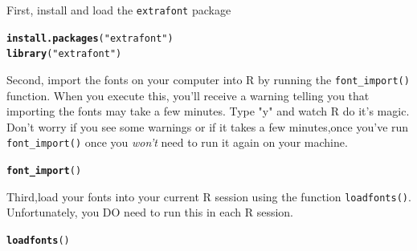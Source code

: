 \documentclass{tufte-book}\usepackage[]{graphicx}\usepackage[]{color}
\makeatletter
\newcommand{\hlstr}[1]{\textcolor[rgb]{0.192,0.494,0.8}{#1}}%
\newcommand{\hlstd}[1]{\textcolor[rgb]{0.345,0.345,0.345}{#1}}%
\newcommand{\hlkwd}[1]{\textcolor[rgb]{0.737,0.353,0.396}{\textbf{#1}}}%
\newenvironment{kframe}{%
 \def\at@end@of@kframe{}%
 \ifinner\ifhmode%
  \def\at@end@of@kframe{\end{minipage}}%
  \begin{minipage}{\columnwidth}%
 \fi\fi%
 \def\FrameCommand##1{\hskip\@totalleftmargin \hskip-\fboxsep
 \colorbox{shadecolor}{##1}\hskip-\fboxsep
     \hskip-\linewidth \hskip-\@totalleftmargin \hskip\columnwidth}%
 \MakeFramed {\advance\hsize-\width
   \@totalleftmargin\z@ \linewidth\hsize
   \@setminipage}}%
 {\par\unskip\endMakeFramed%
 \at@end@of@kframe}
\newenvironment{knitrout}{}{} %
\makeatother
\begin{document}
First, install and load the \texttt{extrafont} package

\begin{knitrout}
\color{fgcolor}\begin{kframe}
\begin{alltt}
\hlkwd{install.packages}\hlstd{(}\hlstr{"extrafont"}\hlstd{)}
\hlkwd{library}\hlstd{(}\hlstr{"extrafont"}\hlstd{)}
\end{alltt}
\end{kframe}
\end{knitrout}

\begin{knitrout}
\color{fgcolor}\begin{kframe}


{\ttfamily\noindent\itshape\color{messagecolor}{\#\# Registering fonts with R}}\end{kframe}
\end{knitrout}


Second, import the fonts on your computer into R by running the \texttt{font\_import()} function. When you execute this, you'll receive a warning telling you that importing the fonts may take a few minutes. Type "y" and watch R do it's magic. Don't worry if you see some warnings or if it takes a few minutes,once you've run \texttt{font\_import()} once you \textit{won't} need to run it again on your machine.

\begin{knitrout}
\color{fgcolor}\begin{kframe}
\begin{alltt}
\hlkwd{font_import}\hlstd{()}
\end{alltt}
\end{kframe}
\end{knitrout}

Third,load your fonts into your current R session using the function \texttt{loadfonts()}. Unfortunately, you DO need to run this in each R session.

\begin{knitrout}
\color{fgcolor}\begin{kframe}
\begin{alltt}
\hlkwd{loadfonts}\hlstd{()}
\end{alltt}
\end{kframe}
\end{knitrout}
\end{document}
